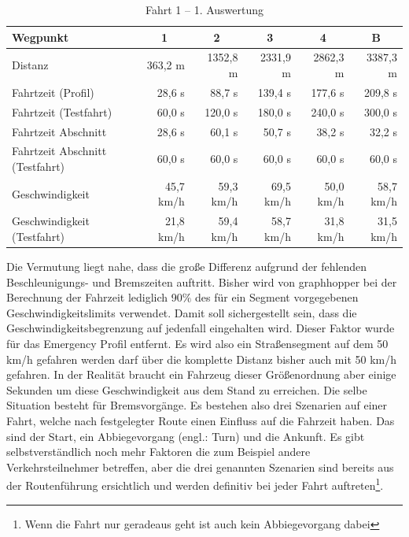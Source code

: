 \begin{table}[]
\centering
\caption{Fahrt 1 -- 1. Auswertung}
\label{tab:driveinit}
\begin{tabular}{|l|r|r|r|r|r|}
\hline
Wegpunkt                               & \multicolumn{1}{c|}{1} & \multicolumn{1}{c|}{2} & \multicolumn{1}{c|}{3} & \multicolumn{1}{c|}{4} & \multicolumn{1}{c|}{B}  \\ \hline
Distanz                                & 363,2 m                & 1352,8 m               & 2331,9 m               & 2862,3 m               & 3387,3 m               \\ \hline
Fahrtzeit (Profil)                     & 28,6 s                 & 88,7 s                 & 139,4 s                & 177,6 s                & 209,8 s                \\ \hline
Fahrtzeit (Testfahrt)                  & 60,0 s                 & 120,0 s                & 180,0 s                & 240,0 s                & 300,0 s                \\ \hline
Fahrtzeit Abschnitt                    & 28,6 s                 & 60,1 s                 & 50,7 s                 & 38,2 s                 & 32,2 s                 \\ \hline
Fahrtzeit Abschnitt (Testfahrt)        & 60,0 s                 & 60,0 s                 & 60,0 s                 & 60,0 s                 & 60,0 s                 \\ \hline
Geschwindigkeit                        & 45,7 km/h              & 59,3 km/h              & 69,5 km/h              & 50,0 km/h              & 58,7 km/h              \\ \hline
Geschwindigkeit (Testfahrt)            & 21,8 km/h              & 59,4 km/h              & 58,7 km/h              & 31,8 km/h              & 31,5 km/h              \\ \hline
\end{tabular}
\end{table}

Die Vermutung liegt nahe, dass die große Differenz aufgrund der fehlenden Beschleunigungs- und Bremszeiten auftritt.
Bisher wird von graphhopper bei der Berechnung der Fahrzeit lediglich 90$\%$ des für ein Segment vorgegebenen Geschwindigkeitslimits verwendet.
Damit soll sichergestellt sein, dass die Geschwindigkeitsbegrenzung auf jedenfall eingehalten wird.
Dieser Faktor wurde für das Emergency Profil entfernt.
Es wird also ein Straßensegment auf dem 50 km/h gefahren werden darf über die komplette Distanz bisher auch mit 50 km/h gefahren.
In der Realität braucht ein Fahrzeug dieser Größenordnung aber einige Sekunden um diese Geschwindigkeit aus dem Stand zu erreichen.
Die selbe Situation besteht für Bremsvorgänge.
Es bestehen also drei Szenarien auf einer Fahrt, welche nach festgelegter Route einen Einfluss auf die Fahrzeit haben.
Das sind der Start, ein Abbiegevorgang (engl.: Turn) und die Ankunft.
Es gibt selbstverständlich noch mehr Faktoren die zum Beispiel andere Verkehrsteilnehmer betreffen, aber die drei genannten Szenarien sind bereits aus der Routenführung ersichtlich und werden definitiv bei jeder Fahrt auftreten\footnote{Wenn die Fahrt nur geradeaus geht ist auch kein Abbiegevorgang dabei}.

